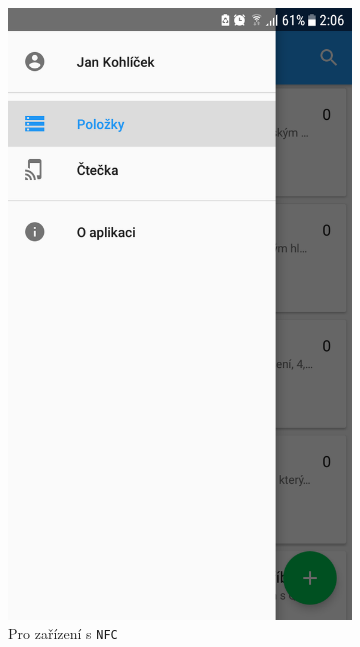\documentclass[12pt]{report}
\begin{document}
\begin{figure}[H]
	\centering
  \begin{subfigure}[b]{0.3\textwidth}
    \centering
	\includegraphics[width=\textwidth]{../images/client_android/Screenshot_20180412-020603.png}	
	\caption{Pro zařízení s \texttt{NFC}}
	\label{fig:Screenshot_20180412-020603}
  \end{subfigure}
  \begin{subfigure}[b]{0.32\textwidth}
    \centering

\end{subfigure}
\end{figure}
\end{document}
